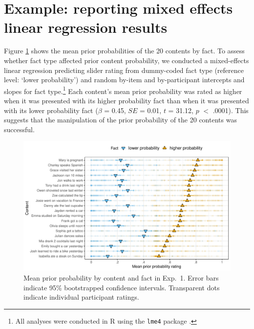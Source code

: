 \documentclass[11pt]{article}
\begin{document}
\section{Example: reporting mixed effects linear regression results}
\label{sec:linear}

Figure \ref{f-prior} shows the mean prior probabilities of the 20 contents by fact. To assess whether fact type affected prior content probability, we conducted a  mixed-effects linear regression predicting slider rating from dummy-coded fact type (reference level: `lower probability') and random by-item and by-participant intercepts and slopes for fact type.\footnote{All analyses were conducted in R \cite{R} using the \texttt{lme4} package \cite{lme4}.} Each content's mean prior probability  was rated as higher when it was presented with its higher probability fact than when it was presented with its lower probability fact ($\beta$ = 0.45, $SE$ = 0.01, $t$ = 31.12, $p$ $<$ .0001). This suggests that the manipulation of the prior probability of the 20 contents was successful. 

\begin{figure}[h!]
\centering
\includegraphics[width=.95\textwidth]{images/prior-ratings}

\caption{Mean prior probability by content and fact in Exp.~1. Error bars indicate 95\% bootstrapped confidence intervals. Transparent dots indicate individual participant ratings.} 
\label{f-prior}
\end{figure}



\setlength{\bibleftmargin}{.125in}
\setlength{\bibindent}{-\bibleftmargin}


\end{document}
